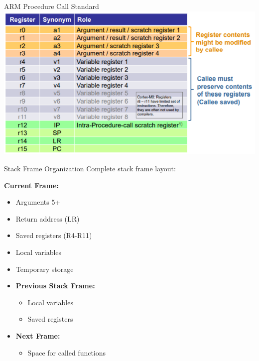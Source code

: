 \begin{definition}{ARM Procedure Call Standard}
\includegraphics[width=\linewidth]{images/register-usage.png}
\end{definition}

\begin{concept}{Stack Frame Organization}
Complete stack frame layout:

\begin{minipage}[t]{0.5\textwidth}
\textbf{Current Frame:}
    \begin{itemize}
      \item Arguments 5+
      \item Return address (LR)
      \item Saved registers (R4-R11)
      \item Local variables
      \item Temporary storage
    \end{itemize}
\end{minipage}
\begin{minipage}[t]{0.5\textwidth}
\begin{itemize}
  \item \textbf{Previous Stack Frame:}
    \begin{itemize}
      \item Local variables
      \item Saved registers
    \end{itemize}
  \item \textbf{Next Frame:}
    \begin{itemize}
      \item Space for called functions
    \end{itemize}
\end{itemize}
\end{minipage}
\end{concept}

